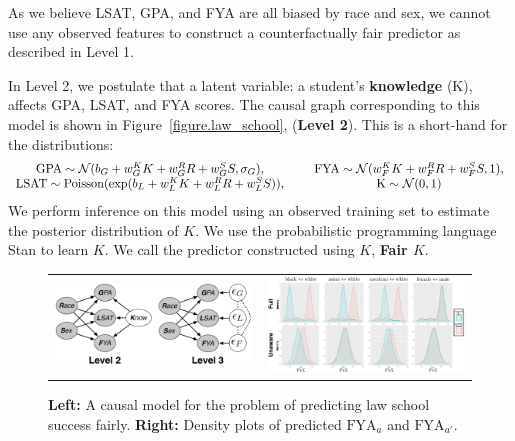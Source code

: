 As we believe LSAT, GPA, and FYA are all biased by race and sex, we
cannot use any observed features to construct a counterfactually fair
predictor as described in Level 1. %

In Level 2, we postulate that a latent variable: a student's
\textbf{knowledge} (K), affects GPA, LSAT, and FYA scores. The causal
graph corresponding to this model is shown in
Figure~\ref{figure.law_school}, (\textbf{Level 2}). This is a
short-hand for the distributions:
\[
\begin{array}{cc}
  \mbox{GPA} \sim {\cal N}(b_{G} + w_{G}^K K + w_{G}^R R + w_{G}^S S, \sigma_{G}),&  \hspace{0.2in}
  \mbox{FYA} \sim {\cal N}(w_{F}^K K + w_{F}^R R + w_{F}^S S, 1),\\
  \mbox{LSAT} \sim \textrm{Poisson}(\exp(b_{L} + w_{L}^K K + w_{L}^R R + w_{L}^S S)),& \hspace{0.2in}
  \mbox{K} \sim {\cal N}(0,1)
\end{array}
\]
We perform inference on this model using an observed training set to
estimate the posterior distribution of $K$. We use the probabilistic
programming language Stan \cite{rstan} to learn $K$. We call the
predictor constructed using $K$, \textbf{Fair $K$}.


\begin{figure}[th]
  \begin{tabular}{p{}p{}}
    \centerline{\includegraphics[width=0.4\columnwidth]{law_school_model}}
    &
      \centerline{\includegraphics[width=0.5\columnwidth]{counterfactual}}
  \end{tabular}
  \caption{{\bf Left:} A causal model for the problem of predicting law school success fairly.\label{figure.law_school}
  {\bf Right:} Density plots of predicted $\mbox{FYA}_a$ and $\mbox{FYA}_{a'}$.\label{figure.counterfactual}
}
\end{figure}

